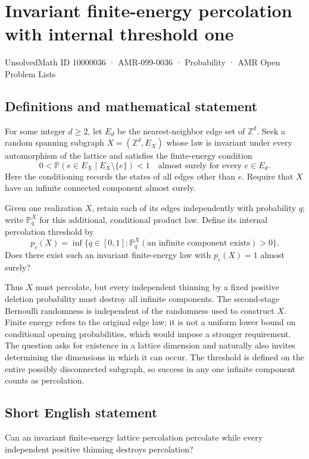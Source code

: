 \documentclass[11pt,a4paper]{article}
\begin{document}
\section*{Invariant finite-energy percolation with internal threshold one}\label{10000036}
{\small UnsolvedMath ID 10000036 · AMR-099-0036 · Probability · AMR Open Problem Lists}
\subsection{Definitions and mathematical statement}
For some integer $d\ge2$, let $E_d$ be the nearest-neighbor edge set of $\mathbb Z^d$. Seek a random spanning subgraph $X=(\mathbb Z^d,E_X)$ whose law is invariant under every automorphism of the lattice and satisfies the finite-energy condition
\[
0<\mathbb P(e\in E_X\mid E_X\setminus\{e\})<1
\quad\text{almost surely for every }e\in E_d.
\]
Here the conditioning records the states of all edges other than $e$. Require that $X$ have an infinite connected component almost surely.

Given one realization $X$, retain each of its edges independently with probability $q$; write $\mathbb P_q^X$ for this additional, conditional product law. Define its internal percolation threshold by
\[
p_c(X)=\inf\{q\in[0,1]:\mathbb P_q^X(\text{an infinite component exists})>0\}.
\]
Does there exist such an invariant finite-energy law with $p_c(X)=1$ almost surely?

Thus $X$ must percolate, but every independent thinning by a fixed positive deletion probability must destroy all infinite components. The second-stage Bernoulli randomness is independent of the randomness used to construct $X$. Finite energy refers to the original edge law; it is not a uniform lower bound on conditional opening probabilities, which would impose a stronger requirement. The question asks for existence in a lattice dimension and naturally also invites determining the dimensions in which it can occur. The threshold is defined on the entire possibly disconnected subgraph, so success in any one infinite component counts as percolation.
\subsection{Short English statement}
Can an invariant finite-energy lattice percolation percolate while every independent positive thinning destroys percolation?
\end{document}
